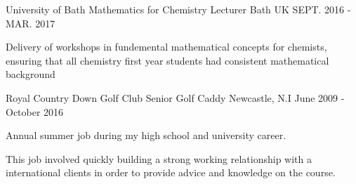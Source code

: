 \begin{cventries}
{	}
	\cventry
	{University of Bath}
	{Mathematics for Chemistry Lecturer}
	{Bath UK}
	{SEPT. 2016 - MAR. 2017}
	{
		\begin{cvitems}
			\item {Delivery of workshops in fundemental mathematical concepts for chemists, ensuring that all chemistry first year students had consistent mathematical background}
		\end{cvitems}
	}
	\cventry
    {Royal Country Down Golf Club}
    {Senior Golf Caddy}
    {Newcastle, N.I}
    {June 2009 - October 2016}
    {
      \begin{cvitems}
        \item {Annual summer job during my high school and university career.}
        \item {This job involved quickly building a strong working relationship with a international clients in order to provide advice and knowledge on the course.}
      \end{cvitems}
    }
\end{cventries}

